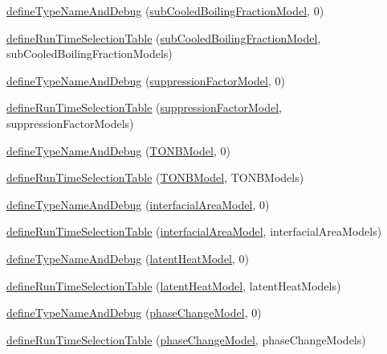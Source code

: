 \begin{DoxyCompactItemize}
\item 
\hyperlink{namespaceFoam_ace752edf11aee71439a2eab64fe3361d}{define\+Type\+Name\+And\+Debug} (\hyperlink{classFoam_1_1subCooledBoilingFractionModel}{sub\+Cooled\+Boiling\+Fraction\+Model}, 0)
\item 
\hyperlink{namespaceFoam_a6a5f81e83160369860d0b7fa51e398f8}{define\+Run\+Time\+Selection\+Table} (\hyperlink{classFoam_1_1subCooledBoilingFractionModel}{sub\+Cooled\+Boiling\+Fraction\+Model}, sub\+Cooled\+Boiling\+Fraction\+Models)
\item 
\hyperlink{namespaceFoam_a5195a83a6bd7231e88844894297660d3}{define\+Type\+Name\+And\+Debug} (\hyperlink{classFoam_1_1suppressionFactorModel}{suppression\+Factor\+Model}, 0)
\item 
\hyperlink{namespaceFoam_a4ea690e4a1367c93e466b9585f962cce}{define\+Run\+Time\+Selection\+Table} (\hyperlink{classFoam_1_1suppressionFactorModel}{suppression\+Factor\+Model}, suppression\+Factor\+Models)
\item 
\hyperlink{namespaceFoam_a5bd02e92f1826be98d2c629e71318860}{define\+Type\+Name\+And\+Debug} (\hyperlink{classFoam_1_1TONBModel}{T\+O\+N\+B\+Model}, 0)
\item 
\hyperlink{namespaceFoam_a335573e4da4cb32153a574b368c7e890}{define\+Run\+Time\+Selection\+Table} (\hyperlink{classFoam_1_1TONBModel}{T\+O\+N\+B\+Model}, T\+O\+N\+B\+Models)
\item 
\hyperlink{namespaceFoam_a7a029424cfb79aa6a2c8d6eb340e4ea6}{define\+Type\+Name\+And\+Debug} (\hyperlink{classFoam_1_1interfacialAreaModel}{interfacial\+Area\+Model}, 0)
\item 
\hyperlink{namespaceFoam_aaefce3c67e5870b5924d082fb51b6cbb}{define\+Run\+Time\+Selection\+Table} (\hyperlink{classFoam_1_1interfacialAreaModel}{interfacial\+Area\+Model}, interfacial\+Area\+Models)
\item 
\hyperlink{namespaceFoam_a67e3c5d3e9c1489c207ace8b42180823}{define\+Type\+Name\+And\+Debug} (\hyperlink{classFoam_1_1latentHeatModel}{latent\+Heat\+Model}, 0)
\item 
\hyperlink{namespaceFoam_a19bb8880e3ea383134154f53cd500b86}{define\+Run\+Time\+Selection\+Table} (\hyperlink{classFoam_1_1latentHeatModel}{latent\+Heat\+Model}, latent\+Heat\+Models)
\item 
\hyperlink{namespaceFoam_aa35fa92b0be586e70ba1670ec27a6fb3}{define\+Type\+Name\+And\+Debug} (\hyperlink{classFoam_1_1phaseChangeModel}{phase\+Change\+Model}, 0)
\item 
\hyperlink{namespaceFoam_aacd9401a13077badbd7c9ca4cc132e0c}{define\+Run\+Time\+Selection\+Table} (\hyperlink{classFoam_1_1phaseChangeModel}{phase\+Change\+Model}, phase\+Change\+Models)

\end{DoxyCompactItemize}
